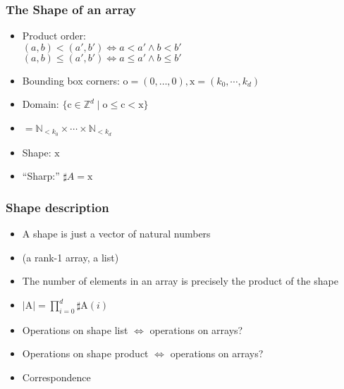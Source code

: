 \documentclass[xetex,mathserif,serif]{beamer}
\newcommand\mrm[1]{\mathrm{#1}}
\newcommand\brm[1]{\bm{\mrm{#1}}}
\newcommand\Nat{\mathbb{N}}
\newcommand\Zheil{\mathbb{Z}}
\begin{document}
\begin{frame}
  \frametitle{The Shape of an array}
  \pause
  \begin{itemize}[<+->]
    \item Product order:\\
      \((a, b) < (a', b') \iff a < a' \land b < b'\)\\
      \((a, b) \le (a', b') \iff a \le a' \land b \le b'\)
    \item Bounding box corners: \(\brm o = (0, \dots, 0), \brm x = (k_0, \cdots, k_d)\)
    \item Domain: \(\{\brm c \in \Zheil^d \mid \brm o \le \brm c < \brm x\}\)
    \item \(= \Nat_{<k_0} \times \cdots \times \Nat_{<k_d}\)
    \item Shape: \(\brm x\)
    \item ``Sharp:'' \(\sharp A = \brm x\)
  \end{itemize}
\end{frame}

\begin{frame}
  \frametitle{Shape description}
  \pause
  \begin{itemize}[<+->]
    \item A shape is just a vector of natural numbers
    \item (a rank-1 array, a list)
    \item The number of elements in an array is precisely the
      product of the shape
    \item \(|\brm A| = \prod_{i=0}^d \sharp \brm A (i)\)
    \item Operations on shape list \(\iff\) operations on arrays?
    \item Operations on shape product \(\iff\) operations on arrays?
    \item Correspondence
  \end{itemize}
\end{frame}
\end{document}
